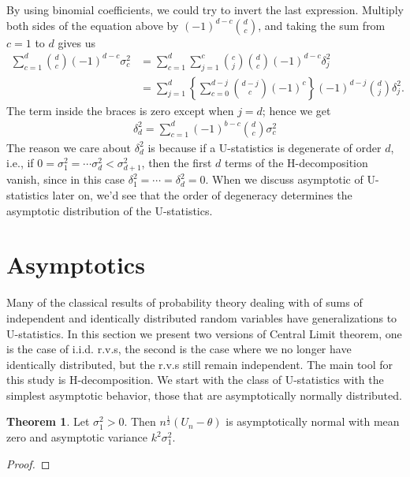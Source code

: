 \documentclass{article}
\theoremstyle{definition}
\newtheorem{theorem}{Theorem}
\numberwithin{Def}{section}
\begin{document}
    By using binomial coefficients, we could try to invert the last expression. Multiply both sides of the equation above by  $(-1)^{d-c} {d \choose c}$, and taking the sum from $c = 1$ to $d$ gives us
    \begin{align*}
        \sum_{c=1}^d {d \choose c} (-1)^{d-c} \sigma_{c}^2 &= \sum_{c=1}^d  
       \sum_{j = 1}^c {c \choose j}  {d \choose c} (-1)^{d-c} \delta_j^2 \\
       &= \sum_{j=1}^d \left\{ \sum_{c = 0}^{d - j} {d - j \choose c} (-1)^c \right\} (-1)^{d -j} {d \choose j} \delta_j^2.
    \end{align*}
    The term inside the braces is zero except when $j = d$; hence we get 
    \begin{align*}
        \delta_d^2 = \sum_{c = 1}^d (-1)^{b-c} {d \choose c} \sigma_{c}^2
    \end{align*}
    The reason we care about $\delta_d^2$ is because if a U-statistics is degenerate of order $d$, i.e., if $0 = \sigma_1^2 = \cdots \sigma_d^2 < \sigma_{d+1}^2$, then the first $d$ terms of the H-decomposition vanish, since in this case $\delta_1^2 = \cdots = \delta_d^2 = 0.$ When we discuss asymptotic of U-statistics later on, we'd see that the order of degeneracy determines the asymptotic distribution of the U-statistics.  
    
    
    
    \section{Asymptotics} 
    Many of the classical results of probability theory dealing with of sums of independent and identically distributed random variables have generalizations to U-statistics. In this section we present two versions of Central Limit theorem, one is the case of i.i.d. r.v.s, the second is the case where we no longer have identically distributed, but the r.v.s still remain independent. 
    The main tool for this study is H-decomposition. We start with the class of U-statistics with the simplest asymptotic behavior, those that are asymptotically normally distributed. 
    
    \begin{theorem}
    Let $\sigma_1^{2} > 0$. Then $n^{\frac{1}{2}}(U_n - \theta)$ is asymptotically normal with mean zero and asymptotic variance $k^2 \sigma_1^2$.
    \end{theorem}
    
    \begin{proof}
    
    \end{proof}
    
\end{document}
